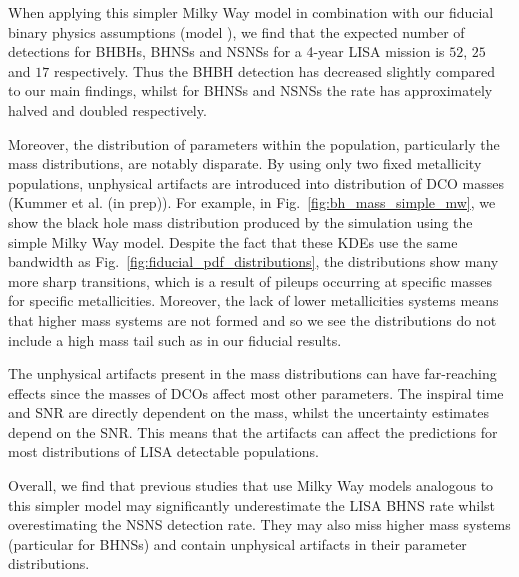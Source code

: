 When applying this simpler Milky Way model in combination with our fiducial binary physics assumptions (model \modFid{}), we find that the expected number of detections for BHBHs, BHNSs and NSNSs for a 4-year LISA mission is $52$, $25$ and $17$ respectively. Thus the BHBH detection has decreased slightly compared to our main findings, whilst for BHNSs and NSNSs the rate has approximately halved and doubled respectively.

Moreover, the distribution of parameters within the population, particularly the mass distributions, are notably disparate. By using only two fixed metallicity populations, unphysical artifacts are introduced into distribution of DCO masses (Kummer et al. (in prep)). For example, in Fig.~\ref{fig:bh_mass_simple_mw}, we show the black hole mass distribution produced by the simulation using the simple Milky Way model. Despite the fact that these KDEs use the same bandwidth as Fig.~\ref{fig:fiducial_pdf_distributions}, the distributions show many more sharp transitions, which is a result of pileups occurring at specific masses for specific metallicities. Moreover, the lack of lower metallicities systems means that higher mass systems are not formed and so we see the distributions do not include a high mass tail such as in our fiducial results.

The unphysical artifacts present in the mass distributions can have far-reaching effects since the masses of DCOs affect most other parameters. The inspiral time and SNR are directly dependent on the mass, whilst the uncertainty estimates depend on the SNR. This means that the artifacts can affect the predictions for most distributions of LISA detectable populations.

Overall, we find that previous studies that use Milky Way models analogous to this simpler model may significantly underestimate the LISA BHNS rate whilst overestimating the NSNS detection rate. They may also miss higher mass systems (particular for BHNSs) and contain unphysical artifacts in their parameter distributions.

